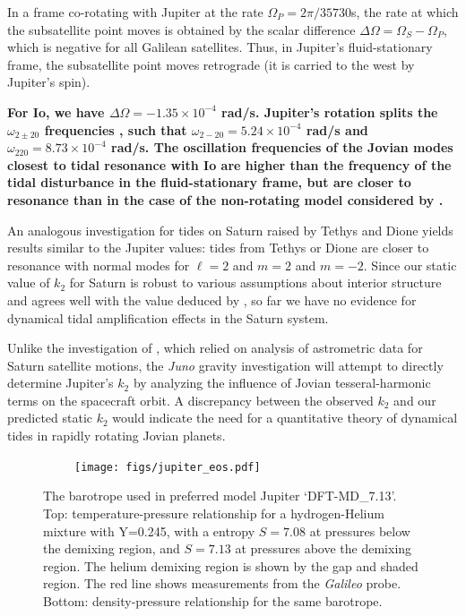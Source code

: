 In a frame co-rotating with Jupiter at the rate $\Omega_P=2 \pi / 35730$s,
the rate at which the subsatellite point moves is obtained by the scalar difference
$\Delta \Omega = \Omega_S - \Omega_P$, which is negative for all Galilean satellites.  Thus,
in Jupiter's fluid-stationary frame, the subsatellite point moves retrograde
(it is carried to the west by Jupiter's spin).  
{\bf For Io, we have $\Delta \Omega = -1.35 \times 10^{-4}$ rad/s.
Jupiter's rotation splits the
$\omega_{2\pm20}$ frequencies \citep{vorontsov1981}, such that
$\omega_{2-20}= 5.24 \times 10^{-4}$ rad/s and
$\omega_{220}= 8.73 \times 10^{-4}$ rad/s.  The oscillation
frequencies of the Jovian modes closest to tidal resonance with Io are
higher than the frequency of the tidal disturbance in
the fluid-stationary frame, but are closer to resonance than
in the case of the non-rotating model considered by
\citet{vorontsov1984}.

An analogous investigation for tides on Saturn raised by
Tethys and Dione yields results similar to the Jupiter values:
tides from Tethys or Dione are closer to resonance with normal modes for $\ell=2$ and
$m=2$ and $m=-2$.  Since our static
value of $k_2$ for Saturn \citep{wahl2016} is robust to various assumptions about interior
structure and agrees well
with the value deduced by \citet{lainey2016}, so far we have no evidence for dynamical
tidal amplification effects in the Saturn system.  

Unlike the investigation of \citet{lainey2016}, which relied on analysis of astrometric data for
Saturn satellite motions, the \textit{Juno} gravity investigation will attempt to directly determine
Jupiter's $k_2$ by analyzing the influence of Jovian tesseral-harmonic terms on the spacecraft orbit.
A discrepancy
between the observed $k_2$ and our predicted static $k_2$
would indicate the need for
a quantitative theory of dynamical tides in rapidly rotating Jovian planets. }

\begin{figure}[h!]  
  \centering
    \texttt{[image: figs/jupiter\_eos.pdf]}
\caption{ The barotrope used in preferred model Jupiter `DFT-MD\_7.13'. Top:
    temperature-pressure relationship for a hydrogen-Helium mixture with Y=0.245,
    with a entropy $S=7.08$ at pressures below the demixing region, and $S=7.13$ at
    pressures above the demixing region. The helium demixing region is shown by the
    gap and shaded region. The red line shows measurements from the \textit{Galileo}
probe. Bottom: density-pressure relationship for the same barotrope.}
\label{fig:eos}
\end{figure}

